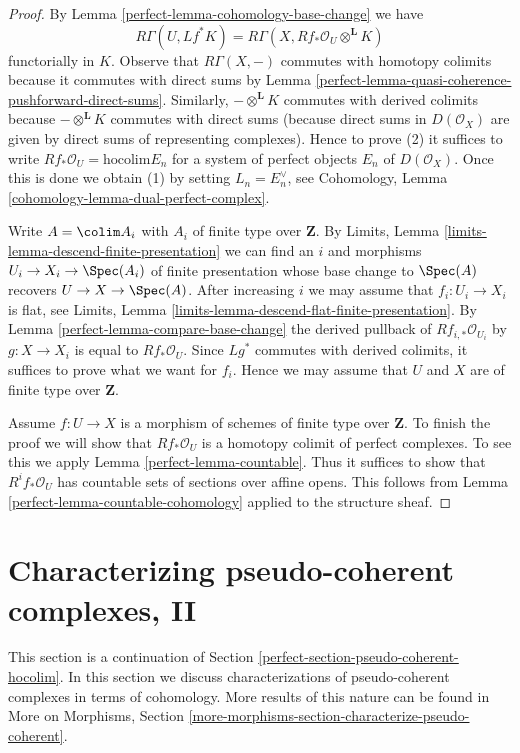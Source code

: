 \begin{proof}

By Lemma \ref{perfect-lemma-cohomology-base-change} we have
$$
R\Gamma(U, Lf^*K) = R\Gamma(X, Rf_*\mathcal{O}_U \otimes^\mathbf{L} K)
$$
functorially in $K$. Observe that $R\Gamma(X, -)$ commutes with
homotopy colimits because it commutes with direct sums by
Lemma \ref{perfect-lemma-quasi-coherence-pushforward-direct-sums}.
Similarly, $- \otimes^\mathbf{L} K$ commutes with derived colimits
because $- \otimes^\mathbf{L} K$ commutes with direct sums
(because direct sums in $D(\mathcal{O}_X)$
are given by direct sums of representing complexes).
Hence to prove (2) it suffices to write
$Rf_*\mathcal{O}_U = \text{hocolim} E_n$ for a system of
perfect objects $E_n$ of $D(\mathcal{O}_X)$. Once this is done
we obtain (1) by setting $L_n = E_n^\vee$, see
Cohomology, Lemma \ref{cohomology-lemma-dual-perfect-complex}.

\medskip\noindent
Write $A = \colim A_i$ with $A_i$ of finite type over $\mathbf{Z}$.
By Limits, Lemma \ref{limits-lemma-descend-finite-presentation}
we can find an $i$ and morphisms $U_i \to X_i \to \Spec(A_i)$
of finite presentation whose base change to $\Spec(A)$ recovers
$U \to X \to \Spec(A)$.
After increasing $i$ we may assume that $f_i : U_i \to X_i$ is
flat, see Limits, Lemma \ref{limits-lemma-descend-flat-finite-presentation}.
By Lemma \ref{perfect-lemma-compare-base-change}
the derived pullback of $Rf_{i, *}\mathcal{O}_{U_i}$
by $g : X \to X_i$ is equal to $Rf_*\mathcal{O}_U$.
Since $Lg^*$ commutes with derived colimits, it suffices
to prove what we want for $f_i$. Hence we may assume that
$U$ and $X$ are of finite type over $\mathbf{Z}$.

\medskip\noindent
Assume $f : U \to X$ is a morphism of schemes of finite type over $\mathbf{Z}$.
To finish the proof we will show that $Rf_*\mathcal{O}_U$ is a homotopy
colimit of perfect complexes. To see this we apply Lemma \ref{perfect-lemma-countable}.
Thus it suffices to show that $R^if_*\mathcal{O}_U$
has countable sets of sections over affine opens.
This follows from Lemma \ref{perfect-lemma-countable-cohomology}
applied to the structure sheaf.
\end{proof}

\section{Characterizing pseudo-coherent complexes, II}
\label{perfect-section-pseudo-coherent}
This section is a continuation of
Section \ref{perfect-section-pseudo-coherent-hocolim}.
In this section we discuss characterizations of pseudo-coherent complexes
in terms of cohomology. More results of this nature can be found in
More on Morphisms, Section
\ref{more-morphisms-section-characterize-pseudo-coherent}.

